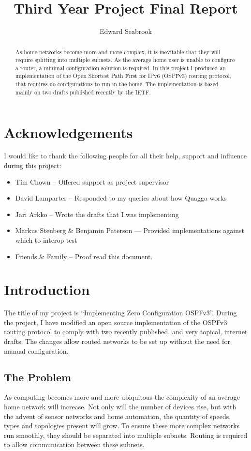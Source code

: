 \documentclass[12pt]{report}
\author{Edward Seabrook}
\title{Third Year Project Final Report}
\begin{document}


\begin{abstract}
As home networks become more and more complex, it is inevitable that they will
require splitting into multiple subnets. As the average home user is unable to
configure a router, a minimal configuration solution is required. In this
project I produced an implementation of the Open Shortest Path First for IPv6
(OSPFv3) routing protocol, that requires no configurations to run in the home.
The implementation is based mainly on two drafts published recently by the
IETF\@{}. 
\end{abstract}

\tableofcontents
\clearpage

\chapter*{Acknowledgements}
I would like to thank the following people for all their help, support and
influence during this project:
\begin{itemize}
\item Tim Chown -- Offered support as project supervisor
\item David Lamparter -- Responded to my queries about how Quagga works
\item Jari Arkko -- Wrote the drafts that I was implementing
\item Markus Stenberg \& Benjamin Paterson --- Provided implementations against which 
      to interop test
\item Friends \& Family -- Proof read this document.
\end{itemize}

\chapter{Introduction}
The title of my project is ``Implementing Zero Configuration OSPFv3''. During
the project, I have modified an open source implementation of the OSPFv3
routing protocol to comply with two recently published, and very topical,
internet drafts. The changes allow routed networks to be set up without the
need for manual configuration.

\section{The Problem}
As computing becomes more and more ubiquitous the complexity of an average home
network will increase. Not only will the number of devices rise, but with the
advent of sensor networks and home automation, the quantity of speeds,
types and topologies present will grow. To ensure these more complex networks
run smoothly, they should be separated into multiple subnets. Routing is
required to allow communication between these subnets. 
\end{document}
